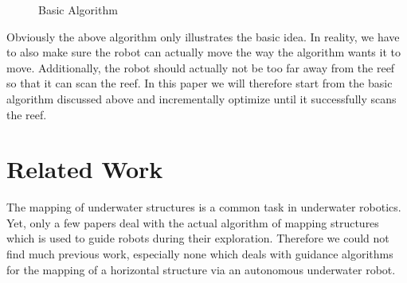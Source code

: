 \documentclass[twoside, 12pt]{article}
\begin{document}
\begin{figure}
\vspace{-26pt}
  \begin{center}
  \end{center}
\vspace{-20pt}
  \caption{Basic Algorithm}
  \label{fig:basicAlgorithm}
\end{figure}

\begin{figure}
\vspace{-50pt}
\end{figure}

Obviously the above algorithm only illustrates the basic idea. In reality, we have to also make sure the robot can actually move the way the algorithm wants it to move. Additionally, the robot should actually not be too far away from the reef so that it can scan the reef. In this paper we will therefore start from the basic algorithm discussed above and incrementally optimize until it successfully scans the reef. \\

\section{Related Work}
\label{sec:relatedworks}

The mapping of underwater structures is a common task in underwater robotics. Yet, only a few papers deal with the actual algorithm of mapping structures which is used to guide robots during their exploration. Therefore we could not find much previous work, especially none which deals with guidance algorithms for the mapping of a horizontal structure via an autonomous underwater robot.\\
\end{document}
